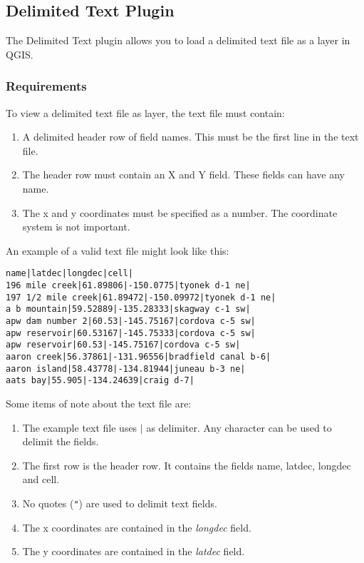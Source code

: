
\subsection{Delimited Text Plugin}\label{label_dltext}    

\updatedisclaimer

The Delimited Text plugin allows you to load a delimited text file as a layer in QGIS. 
    
\subsubsection{Requirements}

To view a delimited text file as layer, the text file must contain:

\begin{enumerate}      
\item A delimited header row of field names. This must be the first line in the text file.
\item The header row must contain an X and Y field. These fields can have any name.
\item The x and y coordinates must be specified as a number. The coordinate system is not important.
\end{enumerate}

An example of a valid text file might look like this:

\begin{verbatim} 
name|latdec|longdec|cell|
196 mile creek|61.89806|-150.0775|tyonek d-1 ne|
197 1/2 mile creek|61.89472|-150.09972|tyonek d-1 ne|
a b mountain|59.52889|-135.28333|skagway c-1 sw|
apw dam number 2|60.53|-145.75167|cordova c-5 sw|
apw reservoir|60.53167|-145.75333|cordova c-5 sw|
apw reservoir|60.53|-145.75167|cordova c-5 sw|
aaron creek|56.37861|-131.96556|bradfield canal b-6|
aaron island|58.43778|-134.81944|juneau b-3 ne|
aats bay|55.905|-134.24639|craig d-7|
\end{verbatim}


Some items of note about the text file are:

\begin{enumerate}        
\item  The example text file uses \mbox{$|$} as delimiter. Any character can be used to delimit the fields.
\item The first row is the header row. It contains the fields name, latdec, longdec and cell.
\item No quotes ({\tt{}"{}}) are used to delimit text fields.
\item The x coordinates are contained in the {\em longdec} field.
\item The y coordinates are contained in the {\em latdec} field.
\end{enumerate}

